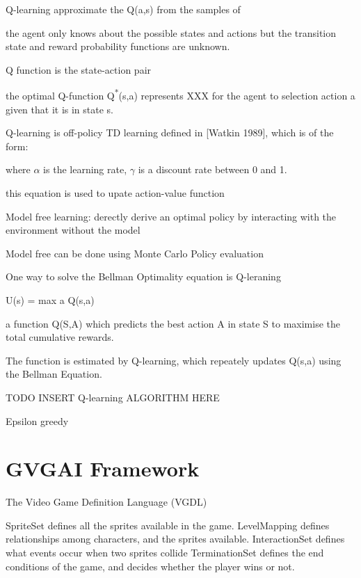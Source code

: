 \documentclass[12pt,twoside]{report}
\begin{document}
Q-learning approximate the Q(a,s) from the samples of

the agent only knows about the possible states and actions but the transition state and reward probability functions are unknown.

Q function is the state-action pair

the optimal Q-function Q\textsuperscript{*}(s,a) represents XXX for the agent to selection action a given that it is in state s.

Q-learning is off-policy TD learning defined in [Watkin 1989], which is of the form:
%
%

where $\alpha$ is the learning rate, $\gamma$ is a discount rate between 0 and 1.

this equation is used to upate action-value function

Model free learning: derectly derive an optimal policy by interacting with the environment without the model

Model free can be done using Monte Carlo Policy evaluation

One way to solve the Bellman Optimality equation is Q-leraning

U(s) = max a Q(s,a)


a function Q(S,A) which predicts the best action A in state S to maximise the total cumulative rewards.

The function is estimated by Q-learning, which repeately updates Q(s,a) using
the Bellman Equation.

TODO INSERT Q-learning ALGORITHM HERE

Epsilon greedy

\section{GVGAI Framework}
\label{gvgai}

The Video Game Definition Language (VGDL)

SpriteSet defines all the sprites available in the game.
LevelMapping defines relationships among characters, and the sprites available.
InteractionSet defines what events occur when two sprites collide
TerminationSet defines the end conditions of the game, and decides whether the player wins or not.
\end{document}
